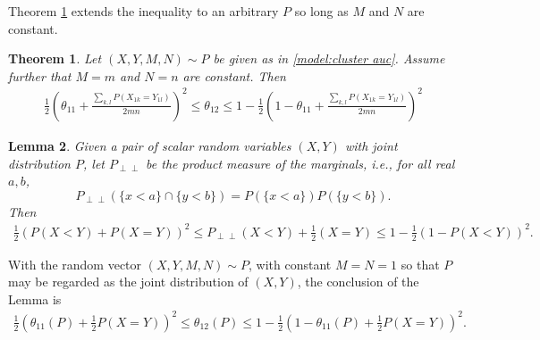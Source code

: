 \documentclass[12pt]{article}
\DeclareMathOperator{\AUC}{AUC}
\renewcommand{\P}{P}
\newcommand{\cind}{\perp \!\!\! \perp}
\newcommand{\aucindiv}{\theta_{11}}%
\newcommand{\aucpop}{\theta_{12}}%
\newtheorem{theorem}{Theorem}
\newtheorem{lemma}[theorem]{Lemma}
\begin{document}
Theorem \ref{theorem:bounds} extends the inequality to an arbitrary $\P$ so long as $M$ and $N$ are constant.

\begin{theorem}\label{theorem:bounds}
  Let $(X,Y,M,N)\sim \P$ be given as in \eqref{model:cluster auc}. Assume
  further that $M=m$ and $N=n$ are constant. Then
  \begin{align}
    \frac{1}{2}\left(\aucindiv+\frac{\sum_{k,l}\P(X_{1k}=Y_{1l})}{2mn}\right)^2 \le \aucpop \le 1-\frac{1}{2}\left(1-\aucindiv+\frac{\sum_{k,l}\P(X_{1k}=Y_{1l})}{2mn}\right)^2
  \end{align}
\end{theorem}
\begin{lemma}\label{lemma:bounds}  Given a pair of scalar random variables $(X,Y)$ with joint distribution $\P$, let $\P_{\cind}$ be the product measure of the marginals, i.e., for all real $a,b$,
  $$
  \P_{\cind}(\{x<a\}\cap\{y<b\})=\P(\{x<a\})\P(\{y<b\}).
  $$
  Then
  \begin{align}
    \frac{1}{2}(\P(X<Y)+\P(X=Y))^2 \le \P_{\cind}(X<Y)+\frac{1}{2}(X=Y)
    \le 1-\frac{1}{2}(1-\P(X<Y))^2.
  \end{align}
\end{lemma}

With the random vector $(X,Y,M,N) \sim \P$, with constant $M=N=1$ so that $\P$ may be regarded as the joint distribution of $(X,Y)$, the conclusion of the Lemma is
\begin{align}
  \frac{1}{2}(\aucindiv(\P)+\frac{1}{2}\P(X=Y))^2 \le \aucpop(P)
  \le 1-\frac{1}{2}(1-\aucindiv(\P)+\frac{1}{2}\P(X=Y))^2.\label{eqn:lemma:bounds:conclusion}
\end{align}
\end{document}
